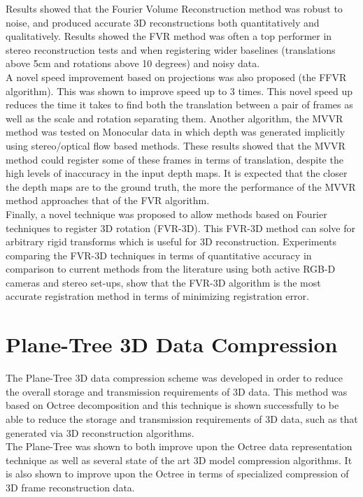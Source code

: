 Results showed that the Fourier Volume Reconstruction method was robust to noise, and produced accurate 3D reconstructions both quantitatively and qualitatively. Results showed the FVR method was often a top performer in stereo reconstruction tests and when registering wider baselines (translations above 5cm and rotations above 10 degrees) and noisy data. \\

A novel speed improvement based on projections was also proposed (the FFVR algorithm). This was shown to improve speed up to 3 times. This novel speed up reduces the time it takes to find both the translation between a pair of frames as well as the scale and rotation separating them. Another algorithm, the MVVR method was tested on Monocular data in which depth was generated implicitly using stereo/optical flow based methods. These results showed that the MVVR method could register some of these frames in terms of translation, despite the high levels of inaccuracy in the input depth maps. It is expected that the closer the depth maps are to the ground truth, the more the performance of the MVVR method approaches that of the FVR algorithm. \\

Finally, a novel technique was proposed to allow methods based on Fourier techniques to register 3D rotation (FVR-3D). This FVR-3D method can solve for arbitrary rigid transforms which is useful for 3D reconstruction. Experiments comparing the FVR-3D techniques in terms of quantitative accuracy in comparison to current methods from the literature using both active RGB-D cameras and stereo set-ups, show that the FVR-3D algorithm is the most accurate registration method in terms of minimizing registration error.  \\

\section{Plane-Tree 3D Data Compression}
\label{Sec:ConcPT}

The Plane-Tree 3D data compression scheme was developed in order to reduce the overall storage and transmission requirements of 3D data. This method was based on Octree decomposition and this technique is shown successfully to be able to reduce the storage and transmission requirements of 3D data, such as that generated via 3D reconstruction algorithms. \\

The Plane-Tree was shown to both improve upon the Octree data representation technique as well as several state of the art 3D model compression algorithms. It is also shown to improve upon the Octree in terms of specialized compression of 3D frame reconstruction data. \\

